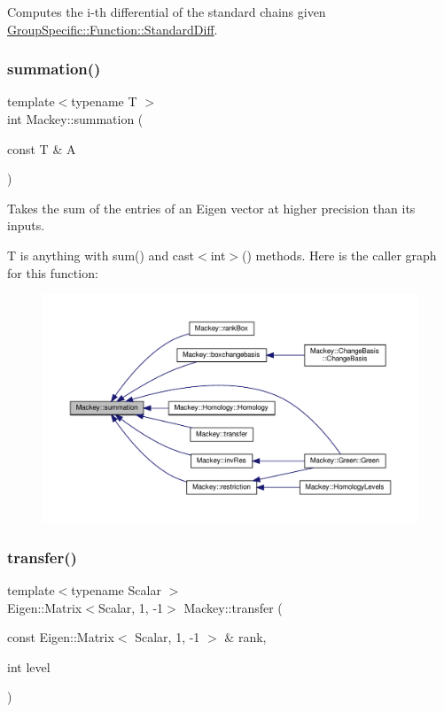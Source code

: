 Computes the i-\/th differential of the standard chains given \hyperlink{classGroupSpecific_1_1Function_a8ead55e2f2e2bbda4deea3964793498d}{Group\+Specific\+::\+Function\+::\+Standard\+Diff}. 

\mbox{\label{namespaceMackey_a37f0a650642090aa89d5cbc89dc5d0ee}} 
\subsubsection{\texorpdfstring{summation()}{summation()}}
{\footnotesize\ttfamily template$<$typename T $>$ \\
int Mackey\+::summation (\begin{DoxyParamCaption}\item[{const T \&}]{A }\end{DoxyParamCaption})}



Takes the sum of the entries of an Eigen vector at higher precision than its inputs. 

T is anything with sum() and cast$<$int$>$() methods. Here is the caller graph for this function\+:\nopagebreak
\begin{figure}[H]
\begin{center}
\leavevmode
\includegraphics[width=350pt]{namespaceMackey_a37f0a650642090aa89d5cbc89dc5d0ee_icgraph}
\end{center}
\end{figure}
\mbox{\label{namespaceMackey_a671613d53fc3b0c9c4b115bc8b2797e6}} 
\subsubsection{\texorpdfstring{transfer()}{transfer()}\hspace{0.1cm}{\footnotesize\ttfamily [1/5]}}
{\footnotesize\ttfamily template$<$typename Scalar $>$ \\
Eigen\+::\+Matrix$<$Scalar, 1, -\/1$>$ Mackey\+::transfer (\begin{DoxyParamCaption}\item[{const Eigen\+::\+Matrix$<$ Scalar, 1, -\/1 $>$ \&}]{rank,  }\item[{int}]{level }\end{DoxyParamCaption})}



